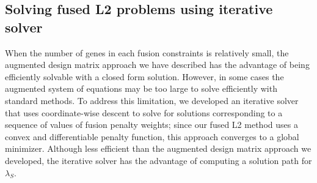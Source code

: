 \documentclass[11pt]{article}
\begin{document}


\subsection{Solving fused L2 problems using iterative solver}

When the number of genes in each fusion constraints is relatively small, the augmented design matrix approach we have described has the advantage of being efficiently solvable with a closed form solution. However, in some cases the augmented system of equations may be too large to solve efficiently with standard methods. To address this limitation, we developed an iterative solver that uses coordinate-wise descent to solve for solutions corresponding to a sequence of values of fusion penalty weights; since our fused L2 method uses a convex and differentiable penalty function, this approach converges to a global minimizer. Although less efficient than the augmented design matrix approach we developed, the iterative solver has the advantage of computing a solution path for $\lambda_S$.
\end{document}
